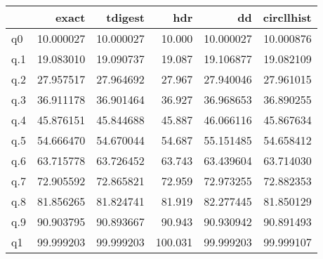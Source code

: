\begin{tabular}{lrrrrr}
\toprule
{} &      exact &    tdigest &      hdr &         dd &  circllhist \\
\midrule
q0  &  10.000027 &  10.000027 &   10.000 &  10.000027 &   10.000876 \\
q.1 &  19.083010 &  19.090737 &   19.087 &  19.106877 &   19.082109 \\
q.2 &  27.957517 &  27.964692 &   27.967 &  27.940046 &   27.961015 \\
q.3 &  36.911178 &  36.901464 &   36.927 &  36.968653 &   36.890255 \\
q.4 &  45.876151 &  45.844688 &   45.887 &  46.066116 &   45.867634 \\
q.5 &  54.666470 &  54.670044 &   54.687 &  55.151485 &   54.658412 \\
q.6 &  63.715778 &  63.726452 &   63.743 &  63.439604 &   63.714030 \\
q.7 &  72.905592 &  72.865821 &   72.959 &  72.973255 &   72.882353 \\
q.8 &  81.856265 &  81.824741 &   81.919 &  82.277445 &   81.850129 \\
q.9 &  90.903795 &  90.893667 &   90.943 &  90.930942 &   90.891493 \\
q1  &  99.999203 &  99.999203 &  100.031 &  99.999203 &   99.999107 \\
\bottomrule
\end{tabular}
